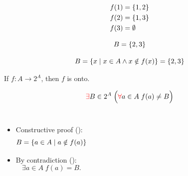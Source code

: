 \begin{frame}{}
  \begin{align*}
    f(1) &= \{1, 2\} \\
    f(2) &= \{1, 3\} \\
    f(3) &= \emptyset
  \end{align*}

  \pause
  \[
    B = \{2, 3\}
  \]

  \pause
  \[
    B = \{x \mid x \in A \land x \notin f(x)\} = \{2, 3\}
  \]
\end{frame}

\begin{frame}{}
  \begin{theorem}
    If $f: A \to 2^{A}$, then $f$ is  onto.
  \end{theorem}

  \[
    \textcolor{red}{\exists} B \in 2^{A}\; \Big(\textcolor{red}{\forall} a \in A\; f(a) \neq B\Big)
  \]

  \pause
  \begin{columns}[t]
      \begin{itemize}
        \item<2-> Constructive proof (\red{$\exists$}):
          \[
            B = \{a \in A \mid a \notin f(a)\}
          \]
        \item<4-> By contradiction (\red{$\forall$}):
          \[
            \exists a \in A\; f(a) = B.
          \]
      \end{itemize}
  \end{columns}

  \vspace{-0.30cm}

  \vspace{-0.60cm}
\end{frame}

